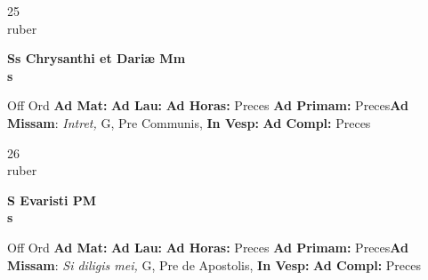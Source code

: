 \documentclass[10pt, openany]{book}
\begin{document}
    \begin{center}
        \begin{minipage}{3.5in}
            \vspace{2em}
            \begin{minipage}{0.5in}
                {\Huge 25} \\
                {\normalsize ruber}
            \end{minipage}
            \begin{minipage}{3.0in}
                \textbf{ \large Ss Chrysanthi et Dariæ Mm \\
                \textnormal{\normalsize s}}

            \end{minipage}
            \begin{justify}Off Ord
                \textbf{Ad Mat: }
                \textbf{Ad Lau: }
                \textbf{Ad Horas: }Preces
                \textbf{Ad Primam: }Preces\textbf{Ad Missam}: \textit{Intret,} G, Pre Communis, 
                \textbf{In Vesp: }
                \textbf{Ad Compl: }Preces
            \end{justify}
        \end{minipage}
    \end{center}

    \begin{center}
        \begin{minipage}{3.5in}
            \vspace{2em}
            \begin{minipage}{0.5in}
                {\Huge 26} \\
                {\normalsize ruber}
            \end{minipage}
            \begin{minipage}{3.0in}
                \textbf{ \large S Evaristi PM \\
                \textnormal{\normalsize s}}

            \end{minipage}
            \begin{justify}Off Ord
                \textbf{Ad Mat: }
                \textbf{Ad Lau: }
                \textbf{Ad Horas: }Preces
                \textbf{Ad Primam: }Preces\textbf{Ad Missam}: \textit{Si diligis mei,} G, Pre de Apostolis, 
                \textbf{In Vesp: }
                \textbf{Ad Compl: }Preces
            \end{justify}
        \end{minipage}
    \end{center}
\end{document}

